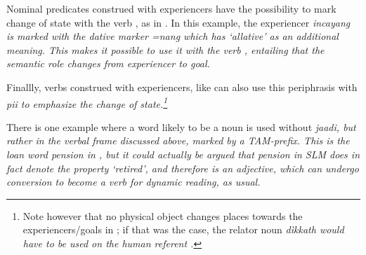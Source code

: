 Nominal predicates construed with experiencers have the possibility to mark change of state with the verb , as in . In this example, the experiencer \em incayang \em is marked with the dative marker \em =nang \em which has `allative' as an additional meaning. This makes it possible to use it with the verb , entailing that the semantic role changes from experiencer to goal.



Finallly, verbs construed with experiencers, like  can also use this periphrasis with \em pii \em to emphasize the change of state.\footnote{Note however that no physical object changes places towards the experiencers/goals in  ; if  that was the case, the relator noun \em dìkkath \em would have to be used on the human referent .}





There is one example where a word likely to be a noun is used without \em jaadi\em, but rather in the verbal frame discussed above, marked by a TAM-prefix. This is the loan word \em pension \em in , but it could actually be argued that \em pension \em in SLM does in fact denote the property `retired', and therefore is an adjective, which can undergo conversion to become a verb for dynamic reading, as usual.




